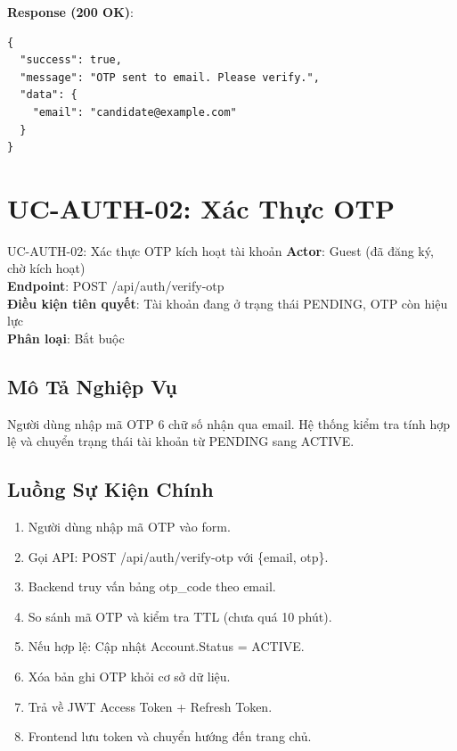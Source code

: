 \documentclass[12pt, a4paper]{report}
\begin{document}
\textbf{Response (200 OK)}:
\begin{lstlisting}[style=javastyle]
{
  "success": true,
  "message": "OTP sent to email. Please verify.",
  "data": {
    "email": "candidate@example.com"
  }
}
\end{lstlisting}

\section{UC-AUTH-02: Xác Thực OTP}

\begin{requirementbox}{UC-AUTH-02: Xác thực OTP kích hoạt tài khoản}
\textbf{Actor}: Guest (đã đăng ký, chờ kích hoạt) \\
\textbf{Endpoint}: POST /api/auth/verify-otp \\
\textbf{Điều kiện tiên quyết}: Tài khoản đang ở trạng thái PENDING, OTP còn hiệu lực \\
\textbf{Phân loại}: Bắt buộc
\end{requirementbox}

\subsection{Mô Tả Nghiệp Vụ}

Người dùng nhập mã OTP 6 chữ số nhận qua email. Hệ thống kiểm tra tính hợp lệ và chuyển trạng thái tài khoản từ PENDING sang ACTIVE.

\subsection{Luồng Sự Kiện Chính}

\begin{enumerate}
    \item Người dùng nhập mã OTP vào form.
    \item Gọi API: POST /api/auth/verify-otp với \{email, otp\}.
    \item Backend truy vấn bảng otp\_code theo email.
    \item So sánh mã OTP và kiểm tra TTL (chưa quá 10 phút).
    \item Nếu hợp lệ: Cập nhật Account.Status = ACTIVE.
    \item Xóa bản ghi OTP khỏi cơ sở dữ liệu.
    \item Trả về JWT Access Token + Refresh Token.
    \item Frontend lưu token và chuyển hướng đến trang chủ.
\end{enumerate}
\end{document}
